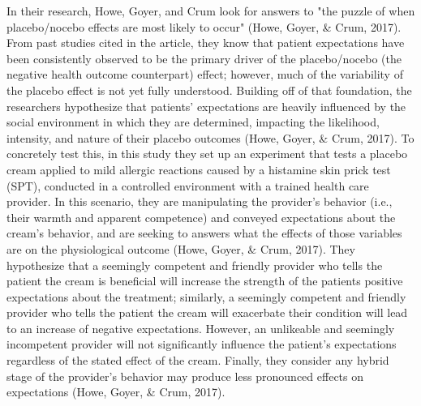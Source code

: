\documentclass[a4paper, 10pt]{article}
\begin{document}
 In their research, Howe, Goyer, and Crum look for answers to "the puzzle of when placebo/nocebo effects are most likely to occur" (Howe, Goyer, \& Crum, 2017). From past studies cited in the article, they know that patient expectations have been consistently observed to be the primary driver of the placebo/nocebo (the negative health outcome counterpart) effect; however, much of the variability of the placebo effect is not yet fully understood. Building off of that foundation, the researchers hypothesize that patients' expectations
 are heavily influenced by the social environment in which they are determined, impacting the likelihood, intensity, and nature of their placebo outcomes (Howe, Goyer, \& Crum, 2017). To concretely test this, in this study they set up an experiment that tests a placebo cream applied to mild allergic reactions caused by a histamine skin prick test (SPT), conducted in a controlled environment with a trained health care provider. In this scenario, they are manipulating the provider's behavior (i.e., their warmth and apparent
 competence) and conveyed expectations about the cream's behavior, and are seeking to answers what the effects of those variables are on the physiological outcome (Howe, Goyer, \& Crum, 2017). They hypothesize that a seemingly competent and friendly provider who tells the patient the cream is beneficial will increase the strength of the patients positive expectations about the treatment; similarly, a seemingly competent and friendly provider who tells the patient the cream will exacerbate their condition will lead to an increase
 of negative expectations. However, an unlikeable and seemingly incompetent provider will not significantly influence the patient's expectations regardless of the stated effect of the cream. Finally, they consider any hybrid stage of the provider's behavior may produce less pronounced effects on expectations (Howe, Goyer, \& Crum, 2017).
\end{document}
